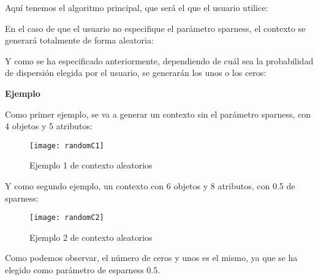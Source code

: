     \clearpage

    Aqu\'i tenemos el algoritmo principal, que ser\'a el que el usuario utilice:

    
    \bigskip

    En el caso de que el usuario no especifique el par\'ametro sparness, el contexto se generar\'a totalmente de forma aleatoria:

    
    \clearpage

    Y como se ha especificado anteriormente, dependiendo de cu\'al sea la probabilidad de dispersi\'on elegida por el usuario, se generar\'an 
    los unos o los ceros:

    
    \bigskip
    
    \bigskip

    \textbf{Ejemplo}

    Como primer ejemplo, se va a generar un contexto sin el par\'ametro sparness, con 4 objetos y 5 atributos:

    \begin{figure}[H]
        \centering
        \texttt{[image: randomC1]}
        \caption{Ejemplo 1 de contexto aleatorios}
        \label{fig:randomC1}
    \end{figure}

    \bigskip
    Y como segundo ejemplo, un contexto con 6 objetos y 8 atributos, con 0.5 de sparness:

    \begin{figure}[H]
        \centering
        \texttt{[image: randomC2]}
        \caption{Ejemplo 2 de contexto aleatorios}
        \label{fig:randomC2}
    \end{figure}

    Como podemos observar, el n\'umero de ceros y unos es el mismo, ya que se ha elegido como par\'ametro de esparness 0.5.
    